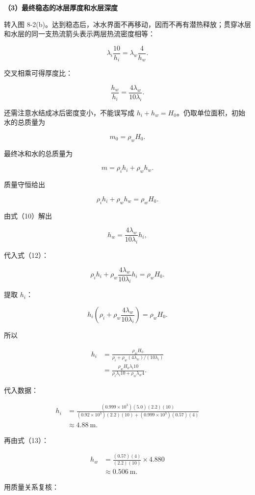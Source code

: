 \documentclass[12pt,a4paper,UTF8]{ctexart}
\begin{document}
\textbf{（3）最终稳态的冰层厚度和水层深度}

转入图
8-2(b)。达到稳态后，冰水界面不再移动，因而不再有潜热释放；贯穿冰层和水层的同一支热流箭头表示两层热流密度相等：

\[
\lambda_i\frac{10}{h_i}
=\lambda_w\frac4{h_w}.
\tag{10}
\]

交叉相乘可得厚度比：

\[
\frac{h_w}{h_i}
=\frac{4\lambda_w}{10\lambda_i}.
\tag{11}
\]

还需注意水结成冰后密度变小，不能误写成
\(h_i+h_w=H_0\)。仍取单位面积，初始水的总质量为

\[
m_0=\rho_wH_0.
\]

最终冰和水的总质量为

\[
m=\rho_ih_i+\rho_wh_w.
\]

质量守恒给出

\[
\rho_ih_i+\rho_wh_w=\rho_wH_0.
\tag{12}
\]

由式（10）解出

\[
h_w=\frac{4\lambda_w}{10\lambda_i}h_i,
\tag{13}
\]

代入式（12）：

\[
\rho_ih_i+\rho_w
\frac{4\lambda_w}{10\lambda_i}h_i
=\rho_wH_0.
\]

提取 \(h_i\)：

\[
h_i\left(
\rho_i+\rho_w\frac{4\lambda_w}{10\lambda_i}
\right)=\rho_wH_0.
\]

所以

\[
\begin{aligned}
h_i
&=\frac{\rho_wH_0}
{\rho_i+\rho_w(4\lambda_w)/(10\lambda_i)}\\
&=\frac{\rho_wH_0\lambda_i10}
{\rho_i\lambda_i10+\rho_w\lambda_w4}.
\end{aligned}\tag{14}
\]

代入数据：

\[
\begin{aligned}
h_i
&=\frac{(0.999\times10^3)(5.0)(2.2)(10)}
{(0.92\times10^3)(2.2)(10)
+(0.999\times10^3)(0.57)(4)}\\
&\approx\boxed{4.88\ \mathrm m}.
\end{aligned}\tag{15}
\]

再由式（13）：

\[
\begin{aligned}
h_w
&=\frac{(0.57)(4)}{(2.2)(10)}\times4.880\\
&\approx\boxed{0.506\ \mathrm m}.
\end{aligned}\tag{16}
\]

用质量关系复核：
\end{document}
